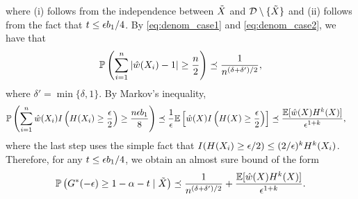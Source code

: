 where (i) follows from the independence between $\tilde{X}$ and $\mathcal{D}\setminus\{\tilde{X}\}$ and (ii) follows from the fact that $t \le \epsilon b_1 / 4$. By \eqref{eq:denom_case1} and \eqref{eq:denom_case2}, we have that
\[\mathbb{P}\left(\sum_{i=1}^{n}|\hat{w}(X_i) - 1|\ge \frac{n}{2}\right)\preceq \frac{1}{n^{(\delta + \delta') / 2}},\]
where $\delta' = \min\{\delta, 1\}$. By Markov's inequality,
\begin{align*}
  \mathbb{P}\left( \sum_{i=1}^{n}\hat{w}(X_i)I\left( H(X_i)\ge \frac{\epsilon}{2}\right)\ge \frac{n\epsilon b_1}{8}\right) &\preceq \frac{1}{\epsilon}\mathbb{E}\left[\hat{w}(X)I\left( H(X)\ge \frac{\epsilon}{2}\right)\right]\preceq \frac{\mathbb{E}[\hat{w}(X)H^{k}(X)]}{\epsilon^{1+k}},
\end{align*}
where the last step uses the simple fact that $I(H(X_i)\ge \epsilon / 2)\le (2/\epsilon)^{k}H^{k}(X_i)$. Therefore, for any $t\le \epsilon b_1 / 4$, we obtain an almost sure bound of the form 
\begin{equation}
  \label{eq:etaX3}
  \mathbb{P}\left( G^{*}(-\epsilon)\ge 1 - \alpha - t \mid \tilde{X}\right) \preceq \frac{1}{n^{(\delta + \delta') / 2}} + \frac{\mathbb{E}[\hat{w}(X)H^{k}(X)]}{\epsilon^{1+k}}.
\end{equation}

